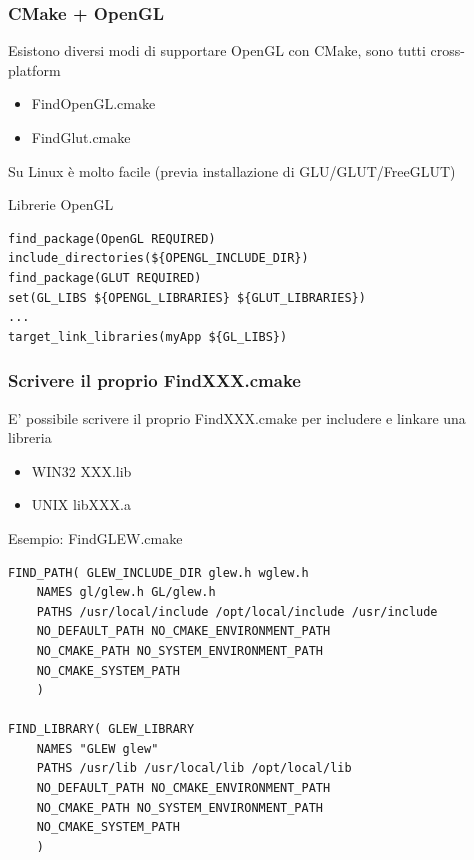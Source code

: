 \documentclass[10pt] {beamer}
\begin{document}

\begin{frame}[fragile]
 \frametitle{CMake + OpenGL}
Esistono diversi modi di supportare OpenGL con CMake, sono tutti cross-platform
\begin{itemize}
 \item FindOpenGL.cmake
 \item FindGlut.cmake
\end{itemize}

Su Linux è molto facile (previa installazione di GLU/GLUT/FreeGLUT)
\begin{block}{Librerie OpenGL}
 \begin{small}
  \begin{verbatim}
find_package(OpenGL REQUIRED)
include_directories(${OPENGL_INCLUDE_DIR})
find_package(GLUT REQUIRED)
set(GL_LIBS ${OPENGL_LIBRARIES} ${GLUT_LIBRARIES})
...
target_link_libraries(myApp ${GL_LIBS})
\end{verbatim}
 \end{small}
\end{block}
\end{frame}


\begin{frame}[fragile]
\frametitle{Scrivere il proprio FindXXX.cmake}
E' possibile scrivere il proprio FindXXX.cmake per includere e linkare una libreria
\begin{itemize}
	\item WIN32 XXX.lib
	\item UNIX libXXX.a
\end{itemize}

\begin{block}{Esempio: FindGLEW.cmake}
\begin{small}
\begin{verbatim}
FIND_PATH( GLEW_INCLUDE_DIR glew.h wglew.h
	NAMES gl/glew.h GL/glew.h
    PATHS /usr/local/include /opt/local/include /usr/include 
    NO_DEFAULT_PATH NO_CMAKE_ENVIRONMENT_PATH
    NO_CMAKE_PATH NO_SYSTEM_ENVIRONMENT_PATH
    NO_CMAKE_SYSTEM_PATH
	)
   
FIND_LIBRARY( GLEW_LIBRARY
	NAMES "GLEW glew"
    PATHS /usr/lib /usr/local/lib /opt/local/lib
    NO_DEFAULT_PATH NO_CMAKE_ENVIRONMENT_PATH
    NO_CMAKE_PATH NO_SYSTEM_ENVIRONMENT_PATH
    NO_CMAKE_SYSTEM_PATH
    )
\end{verbatim}
\end{small}
\end{block}

\end{frame}
\end{document}
